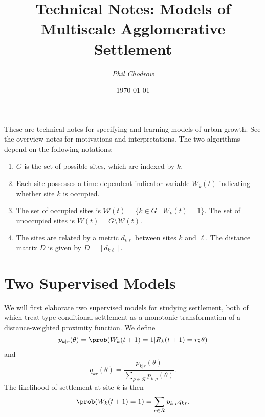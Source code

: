 \documentclass[english]{scrartcl}
\title{Technical Notes: Models of Multiscale Agglomerative Settlement}
\author{\emph{Phil Chodrow}}
\date{\today}
\begin{document}

\maketitle


These are technical notes for specifying and learning models of urban growth. 
See the overview notes for motivations and interpretations. 
The two algorithms depend on the following notations: 
\begin{enumerate}
	\item $G$ is the set of possible sites, which are indexed by $k$.
	\item Each site possesses a time-dependent indicator variable $W_k(t)$ indicating whether site $k$ is occupied. 
	\item The set of occupied sites is $\mathcal{W}(t) = \{k \in G \;|\; W_k(t) = 1\}$. The set of unoccupied sites is $\bar{W}(t) = G \setminus \mathcal{W}(t)$. 
	\item The sites are related by a metric $d_{k\ell}$ between sites $k$ and $\ell$. The distance matrix $D$ is given by $D = [d_{k\ell}]$. 
\end{enumerate}

\section{Two Supervised Models}

	We will first elaborate two supervised models for studying settlement, both of which treat type-conditional settlement as a monotonic transformation of a distance-weighted proximity function. 
	We define 
	\begin{equation}
		p_{k|r}(\theta) = \prob(W_k(t+1) = 1 | R_k(t+1) = r; \theta)
	\end{equation}
	and 
	\begin{equation}
		q_{kr}(\theta) = \frac{p_{k|r}(\theta)}{\sum_{\rho \in \mathcal{R}} p_{k|\rho}(\theta)}. 
	\end{equation}
	The likelihood of settlement at site $k$ is then 
	\begin{equation}
		\prob(W_k(t + 1) = 1) = \sum_{r \in \mathcal{R}} p_{k|r} q_{kr}. 
	\end{equation}
\end{document}
